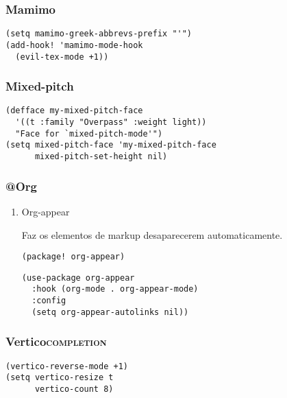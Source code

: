\documentclass[11pt]{article}
\begin{document}
\subsubsection{Mamimo}
\label{sec:org4902dab}

\begin{verbatim}
(setq mamimo-greek-abbrevs-prefix "'")
(add-hook! 'mamimo-mode-hook
  (evil-tex-mode +1))
\end{verbatim}

\subsubsection{Mixed-pitch}
\label{sec:orgb5b9b2e}

\begin{verbatim}
(defface my-mixed-pitch-face
  '((t :family "Overpass" :weight light))
  "Face for `mixed-pitch-mode'")
(setq mixed-pitch-face 'my-mixed-pitch-face
      mixed-pitch-set-height nil)
\end{verbatim}

\subsubsection{@Org}
\label{sec:orge433c41}
\begin{enumerate}
\item Org-appear
\label{sec:org2109952}

Faz os elementos de markup desaparecerem automaticamente.

\begin{verbatim}
(package! org-appear)
\end{verbatim}

\begin{verbatim}
(use-package org-appear
  :hook (org-mode . org-appear-mode)
  :config
  (setq org-appear-autolinks nil))
\end{verbatim}
\end{enumerate}

\subsubsection{Vertico\hfill{}\textsc{completion}}
\label{sec:orgaf65f9f}

\begin{verbatim}
(vertico-reverse-mode +1)
(setq vertico-resize t
      vertico-count 8)
\end{verbatim}
\end{document}
